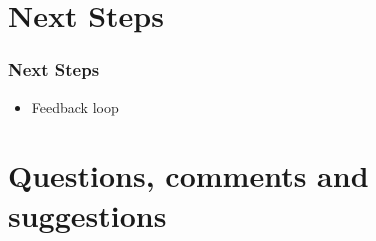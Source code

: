 \documentclass[aspectratio=169,10pt]{beamer}
\begin{document}




\section{Next Steps}

\begin{frame}
  \frametitle{Next Steps}
  \begin{itemize}
    \item Feedback loop
  \end{itemize}
\end{frame}

\section{Questions, comments and suggestions}
\end{document}
